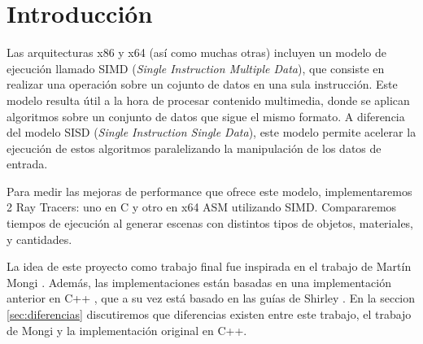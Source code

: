 \section{Introducción} \label{sec:introduccion}

Las arquitecturas x86 y x64 (así como muchas otras) incluyen un modelo de ejecución llamado SIMD
(\textit{Single Instruction Multiple Data}), que consiste en realizar una operación sobre un cojunto
de datos en una sula instrucción. Este modelo resulta útil a la hora de procesar contenido
multimedia, donde se aplican algoritmos sobre un conjunto de datos que sigue el mismo formato. A
diferencia del modelo SISD (\textit{Single Instruction Single Data}), este modelo permite acelerar
la ejecución de estos algoritmos paralelizando la manipulación de los datos de entrada.

Para medir las mejoras de performance que ofrece este modelo, implementaremos 2 Ray Tracers: uno en
C y otro en x64 ASM utilizando SIMD. Compararemos tiempos de ejecución al generar escenas con
distintos tipos de objetos, materiales, y cantidades.

La idea de este proyecto como trabajo final fue inspirada en el trabajo de Martín Mongi
\cite{rtmartin}. Además, las implementaciones están basadas en una implementación anterior en C++
\cite{RayTracerCpp}, que a su vez está basado en las guías de Shirley \cite{RTIOW}. En la seccion
\ref{sec:diferencias} discutiremos que diferencias existen entre este trabajo, el trabajo de Mongi y
la implementación original en C++.

